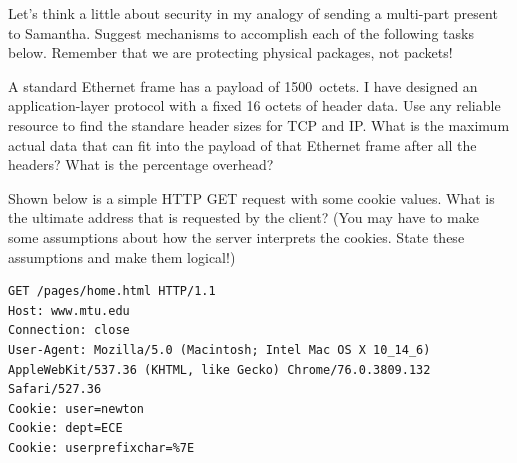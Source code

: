 \documentclass[12pt,addpoints,answers]{exam}
\begin{document}
\begin{questions}
\question Let's think a little about security in my analogy of sending a multi-part present to Samantha. Suggest mechanisms to accomplish each of the following tasks below. Remember that we are protecting physical packages, not packets!
\begin{solution}
\end{solution}

\question[8] A standard Ethernet frame has a payload of \SI{1500}{octets}. I have designed an application-layer protocol with a fixed 16 octets of header data. Use any reliable resource to find the standare header sizes for TCP and IP. What is the maximum actual data that can fit into the payload of that Ethernet frame after all the headers? What is the percentage overhead?
\begin{solution}
\end{solution}

\question[8] Shown below is a simple HTTP GET request with some cookie values. What is the ultimate address that is requested by the client? (You may have to make some assumptions about how the server interprets the cookies. State these assumptions and make them logical!)\\
\begin{minipage}{\textwidth}
\begin{lstlisting}[language={},escapechar=§,basicstyle=\ttfamily,breaklines=true]
GET /pages/home.html HTTP/1.1
Host: www.mtu.edu
Connection: close
User-Agent: Mozilla/5.0 (Macintosh; Intel Mac OS X 10_14_6) AppleWebKit/537.36 (KHTML, like Gecko) Chrome/76.0.3809.132 Safari/527.36
Cookie: user=newton
Cookie: dept=ECE
Cookie: userprefixchar=%7E
\end{lstlisting}
\end{minipage}
\begin{solution}
\end{solution}


\end{questions}
\end{document}
